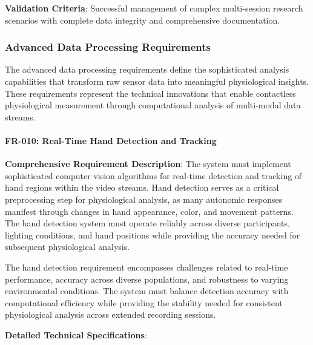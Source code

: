 \documentclass[12pt,a4paper]{article}
\begin{document}
\textbf{Validation Criteria}: Successful management of complex multi-session research scenarios with complete data integrity
and comprehensive documentation.

\subsubsection{Advanced Data Processing Requirements}

The advanced data processing requirements define the sophisticated analysis capabilities that transform raw sensor data
into meaningful physiological insights. These requirements represent the technical innovations that enable contactless
physiological measurement through computational analysis of multi-modal data streams.

\paragraph{FR-010: Real-Time Hand Detection and Tracking}

\textbf{Comprehensive Requirement Description}: The system must implement sophisticated computer vision algorithms for
real-time detection and tracking of hand regions within the video streams. Hand detection serves as a critical
preprocessing step for physiological analysis, as many autonomic responses manifest through changes in hand appearance,
color, and movement patterns. The hand detection system must operate reliably across diverse participants, lighting
conditions, and hand positions while providing the accuracy needed for subsequent physiological analysis.

The hand detection requirement encompasses challenges related to real-time performance, accuracy across diverse
populations, and robustness to varying environmental conditions. The system must balance detection accuracy with
computational efficiency while providing the stability needed for consistent physiological analysis across extended
recording sessions.

\textbf{Detailed Technical Specifications}:
\end{document}
